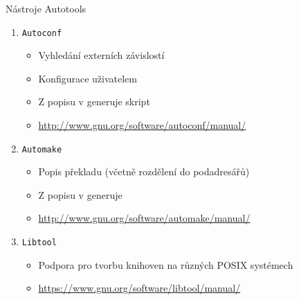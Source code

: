 \begin{frame}{Nástroje Autotools}

  \begin{enumerate}
    \item \texttt{Autoconf}
    \begin{itemize}
      \item Vyhledání externích závislostí
      \item Konfigurace uživatelem
      \item Z popisu v  generuje skript 
      \item \url{http://www.gnu.org/software/autoconf/manual/}
    \end{itemize}

    \pause

    \item \texttt{Automake}
    \begin{itemize}
      \item Popis překladu (včetně rozdělení do podadresářů)
      \item Z popisu v  generuje 
      \item \url{http://www.gnu.org/software/automake/manual/}
    \end{itemize}

    \pause

    \item \texttt{Libtool}
    \begin{itemize}
      \item Podpora pro tvorbu knihoven na různých POSIX systémech
      \item \url{https://www.gnu.org/software/libtool/manual/}
    \end{itemize}
  \end{enumerate}

  \pause
  \medskip


  \pause
  \smallskip


\end{frame}

